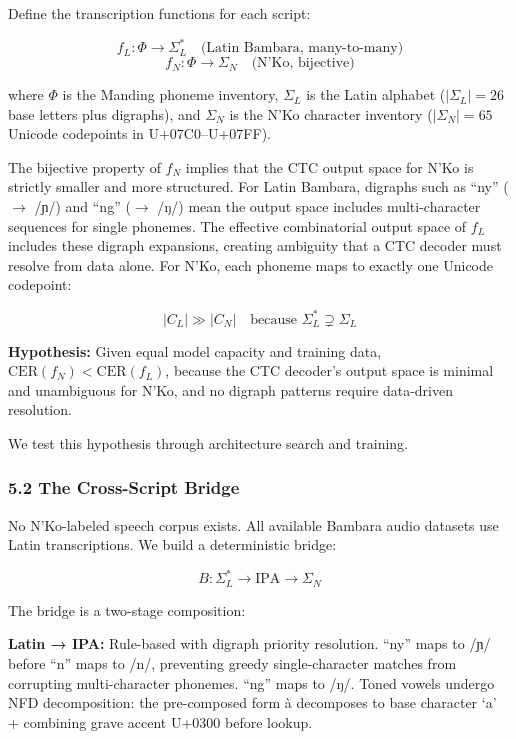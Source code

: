 \documentclass[
]{article}
\begin{document}
Define the transcription functions for each script:

\[f_L: \Phi \to \Sigma_L^* \quad \text{(Latin Bambara, many-to-many)}\]
\[f_N: \Phi \to \Sigma_N \quad \text{(N'Ko, bijective)}\]

where \(\Phi\) is the Manding phoneme inventory, \(\Sigma_L\) is the
Latin alphabet (\(|\Sigma_L| = 26\) base letters plus digraphs), and
\(\Sigma_N\) is the N'Ko character inventory (\(|\Sigma_N| = 65\)
Unicode codepoints in U+07C0--U+07FF).

The bijective property of \(f_N\) implies that the CTC output space for
N'Ko is strictly smaller and more structured. For Latin Bambara,
digraphs such as ``ny'' (\(\to\) /ɲ/) and ``ng'' (\(\to\) /ŋ/) mean the
output space includes multi-character sequences for single phonemes. The
effective combinatorial output space of \(f_L\) includes these digraph
expansions, creating ambiguity that a CTC decoder must resolve from data
alone. For N'Ko, each phoneme maps to exactly one Unicode codepoint:

\[|C_L| \gg |C_N| \quad \text{because } \Sigma_L^* \supsetneq \Sigma_L\]

\textbf{Hypothesis:} Given equal model capacity and training data,
\(\text{CER}(f_N) < \text{CER}(f_L)\), because the CTC decoder's output
space is minimal and unambiguous for N'Ko, and no digraph patterns
require data-driven resolution.

We test this hypothesis through architecture search and training.

\subsubsection{5.2 The Cross-Script
Bridge}\label{the-cross-script-bridge}

No N'Ko-labeled speech corpus exists. All available Bambara audio
datasets use Latin transcriptions. We build a deterministic bridge:

\[B: \Sigma_L^* \to \text{IPA} \to \Sigma_N\]

The bridge is a two-stage composition:

\textbf{Latin → IPA:} Rule-based with digraph priority resolution.
``ny'' maps to /ɲ/ before ``n'' maps to /n/, preventing greedy
single-character matches from corrupting multi-character phonemes.
``ng'' maps to /ŋ/. Toned vowels undergo NFD decomposition: the
pre-composed form à decomposes to base character `a' + combining grave
accent U+0300 before lookup.
\end{document}
